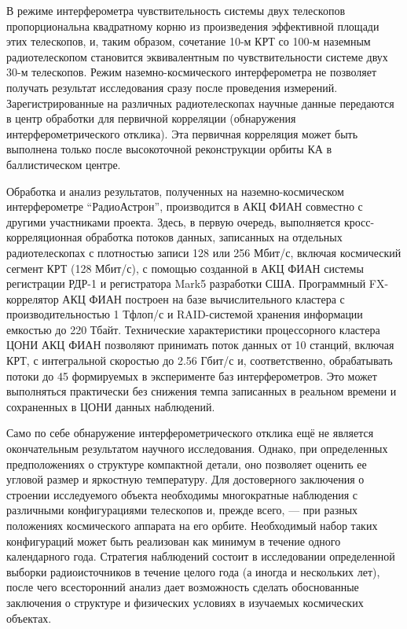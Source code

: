 В режиме интерферометра чувствительность системы двух телескопов
пропорциональна квадратному корню из произведения эффективной
площади этих телескопов, и, таким образом, сочетание 10-м КРТ со 100-м
наземным радиотелескопом становится эквивалентным по чувствительности
системе двух 30-м телескопов. Режим наземно-космического
интерферометра не позволяет
получать результат исследования сразу после проведения измерений.
Зарегистрированные на различных радиотелескопах научные данные
передаются в центр обработки для первичной корреляции (обнаружения
интерферометрического отклика). Эта первичная корреляция может быть
выполнена только после высокоточной реконструкции орбиты КА в
баллистическом центре.

Обработка и анализ результатов,
полученных на наземно-космическом интерферометре ``РадиоАстрон'',
производится в АКЦ ФИАН совместно с другими участниками проекта. Здесь,
в первую очередь, выполняется кросс-корреляционная обработка потоков
данных, записанных на отдельных радиотелескопах с плотностью записи 128
или 256 Мбит/с, включая космический сегмент КРТ (128 Мбит/с),
с помощью созданной в АКЦ ФИАН системы регистрации РДР-1
\cite{} и регистратора Mark5 \cite{} разработки
США. Программный FX-коррелятор АКЦ ФИАН построен на базе вычислительного
кластера с производительностью 1 Тфлоп/с и RAID-системой хранения
информации емкостью до 220 Тбайт.
Технические характеристики процессорного кластера ЦОНИ АКЦ ФИАН
позволяют принимать поток данных от 10 станций, включая КРТ, с
интегральной скоростью до 2.56 Гбит/с и, соответственно, обрабатывать
потоки до 45 формируемых в эксперименте баз интерферометров.
Это может выполняться практически без снижения темпа записанных
в реальном времени и сохраненных в ЦОНИ данных наблюдений.


Само по себе обнаружение интерферометрического отклика ещё не является
окончательным результатом научного исследования.
Однако, при определенных предположениях о структуре компактной детали,
оно позволяет оценить ее угловой размер и яркостную температуру.
Для достоверного заключения о строении
исследуемого объекта необходимы многократные наблюдения с различными
конфигурациями телескопов и, прежде всего, --- при разных положениях
космического аппарата на его орбите. Необходимый набор таких конфигураций
может быть реализован как минимум в течение одного календарного года.
Стратегия наблюдений состоит в исследовании определенной выборки радиоисточников
в течение целого года (а иногда и нескольких лет), после чего
всесторонний анализ дает возможность сделать обоснованные заключения о
структуре и физических условиях в изучаемых космических объектах.

